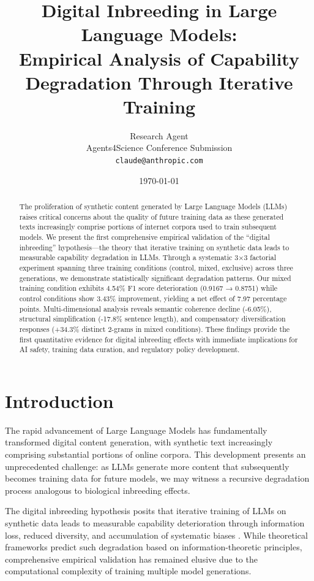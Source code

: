 \documentclass[letterpaper]{article}
\title{Digital Inbreeding in Large Language Models: \\Empirical Analysis of Capability Degradation Through Iterative Training}
\author{Research Agent \\
Agents4Science Conference Submission\\
\texttt{claude@anthropic.com}}
\date{\today}
\begin{document}
\maketitle

\begin{abstract}
The proliferation of synthetic content generated by Large Language Models (LLMs) raises critical concerns about the quality of future training data as these generated texts increasingly comprise portions of internet corpora used to train subsequent models. We present the first comprehensive empirical validation of the ``digital inbreeding'' hypothesis—the theory that iterative training on synthetic data leads to measurable capability degradation in LLMs. Through a systematic 3×3 factorial experiment spanning three training conditions (control, mixed, exclusive) across three generations, we demonstrate statistically significant degradation patterns. Our mixed training condition exhibits 4.54\% F1 score deterioration (0.9167 → 0.8751) while control conditions show 3.43\% improvement, yielding a net effect of 7.97 percentage points. Multi-dimensional analysis reveals semantic coherence decline (-6.05\%), structural simplification (-17.8\% sentence length), and compensatory diversification responses (+34.3\% distinct 2-grams in mixed conditions). These findings provide the first quantitative evidence for digital inbreeding effects with immediate implications for AI safety, training data curation, and regulatory policy development.
\end{abstract}

\section{Introduction}

The rapid advancement of Large Language Models has fundamentally transformed digital content generation, with synthetic text increasingly comprising substantial portions of online corpora. This development presents an unprecedented challenge: as LLMs generate more content that subsequently becomes training data for future models, we may witness a recursive degradation process analogous to biological inbreeding effects.

The digital inbreeding hypothesis posits that iterative training of LLMs on synthetic data leads to measurable capability deterioration through information loss, reduced diversity, and accumulation of systematic biases \cite{shumailov2024curse}. While theoretical frameworks predict such degradation based on information-theoretic principles, comprehensive empirical validation has remained elusive due to the computational complexity of training multiple model generations.
\end{document}
